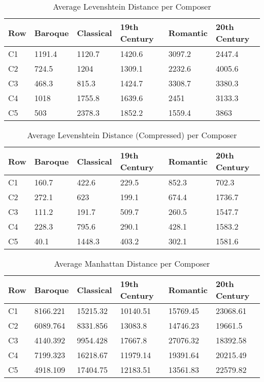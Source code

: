 \begin{longtable}{|l|l|l|l|l|l|}
\caption{Average Levenshtein Distance per Composer}
\label{my-label}\\
\hline
Row & Baroque & Classical & 19th Century & Romantic & 20th Century \\ \hline
\endfirsthead
%
\endhead
%
C1 & 1191.4 & 1120.7 & 1420.6 & 3097.2 & 2447.4 \\ \hline
C2 & 724.5 & 1204 & 1309.1 & 2232.6 & 4005.6 \\ \hline
C3 & 468.3 & 815.3 & 1424.7 & 3308.7 & 3380.3 \\ \hline
C4 & 1018 & 1755.8 & 1639.6 & 2451 & 3133.3 \\ \hline
C5 & 503 & 2378.3 & 1852.2 & 1559.4 & 3863 \\ \hline
\end{longtable}

\begin{longtable}{|l|l|l|l|l|l|}
\caption{Average Levenshtein Distance (Compressed) per Composer}
\label{my-label}\\
\hline
Row & Baroque & Classical & 19th Century & Romantic & 20th Century  \\ \hline
\endfirsthead
%
\endhead
%
C1 & 160.7 & 422.6 & 229.5 & 852.3 & 702.3 \\ \hline
C2 & 272.1 & 623 & 199.1 & 674.4 & 1736.7 \\ \hline
C3 & 111.2 & 191.7 & 509.7 & 260.5 & 1547.7 \\ \hline
C4 & 228.3 & 795.6 & 290.1 & 428.1 & 1583.2 \\ \hline
C5 & 40.1 & 1448.3 & 403.2 & 302.1 & 1581.6 \\ \hline
\end{longtable}

\begin{longtable}{|l|l|l|l|l|l|}
\caption{Average Manhattan Distance per Composer}
\label{my-label}\\
\hline
Row & Baroque & Classical & 19th Century & Romantic & 20th Century \\ \hline
\endfirsthead
%
\endhead
%
C1 & 8166.221 & 15215.32 & 10140.51 & 15769.45 & 23068.61 \\ \hline
C2 & 6089.764 & 8331.856 & 13083.8 & 14746.23 & 19661.5 \\ \hline
C3 & 4140.392 & 9954.428 & 17667.8 & 27076.32 & 18392.58 \\ \hline
C4 & 7199.323 & 16218.67 & 11979.14 & 19391.64 & 20215.49 \\ \hline
C5 & 4918.109 & 17404.75 & 12183.51 & 13561.83 & 22579.82 \\ \hline
\end{longtable}

